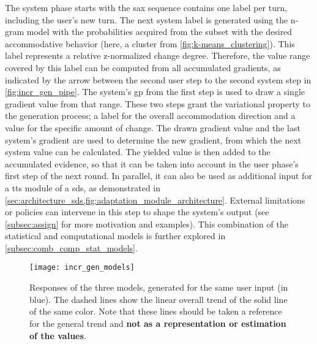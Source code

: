 The system phase starts with the \ac{sax} sequence contains one label per turn, including the user's new turn.
The next system label is generated using the n-gram model with the probabilities acquired from the subset with the desired accommodative behavior (here, a cluster from \cref{fig:k-means_clustering}).
This label represents a relative z-normalized change degree.
Therefore, the value range covered by this label can be computed from all accumulated gradients, as indicated by the arrow between the second user step to the second system step in \cref{fig:incr_gen_pipe}.
The system's \ac{gp} from the first step is used to draw a single gradient value from that range.
These two steps grant the variational property to the generation process; a label for the overall accommodation direction and a value for the specific amount of change.
The drawn gradient value and the last system's gradient are used to determine the new gradient, from which the next system value can be calculated.
The yielded value is then added to the accumulated evidence, so that it can be taken into account in the user phase's first step of the next round.
In parallel, it can also be used as additional input for a \ac{tts} module of a \acl{sds}, as demonstrated in \cref{sec:architecture_sds,fig:adaptation_module_architecture}.
External limitations or policies can intervene in this step to shape the system's output (see \cref{subsec:assign} for more motivation and examples).
This combination of the statistical and computational models is further explored in \cref{subsec:comb_comp_stat_models}.

\begin{figure}[t]
	\centering
	\texttt{[image: incr\_gen\_models]}
	\caption[Probabilistic generation of captured accommodation behaviors]
		{Responses of the three models, generated for the same user input (in blue).
	 	 The dashed lines show the linear overall trend of the solid line of the same color.
	 	 Note that these lines should be taken a reference for the general trend and \textbf{not as a representation or estimation of the values}.}
	\label{fig:incr_gen_models}
\end{figure}


